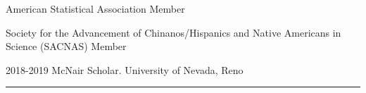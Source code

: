 \documentclass{article}
\begin{document}


\begin{description}
	\vspace{-2mm}
	\item[Programs and Professional Membership]\hspace*{.01in}
		
		American Statistical Association Member
		\vspace*{1mm}
		
		Society for the Advancement of Chinanos/Hispanics and Native Americans in Science (SACNAS) Member
		
		2018-2019 McNair Scholar. University of Nevada, Reno
		\vspace*{1mm}
		
\end{description}
\vspace{-2mm}
\rule{\linewidth}{1pt}



\end{document}
